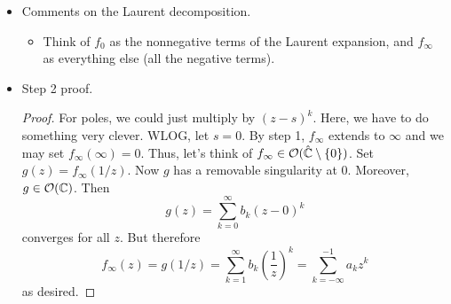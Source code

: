 \documentclass[../notes.tex]{subfiles}
\begin{document}
\begin{itemize}
\begin{proof}
\begin{figure}[H]
            \caption{Laurent decomposition theorem.}
            \label{fig:laurentDecomp}
        \end{figure}
        Additionally, $\partial D_2-\partial D_1$ is nulhomologous in $U\setminus 0$. Thus, by the general CIF,
        \begin{equation*}
            f(z) = \frac{1}{2\pi i}\int_{\partial D_2-\partial D_1}\frac{f(\zeta)}{\zeta-z}\dd\zeta
            = \underbrace{\frac{1}{2\pi i}\int_{\partial D_2}\frac{f(\zeta)}{\zeta-z}\dd\zeta}_{f_0}-\underbrace{\frac{1}{2\pi i}\int_{\partial D_1}\frac{f(\zeta)}{\zeta-z}\dd\zeta}_{-f_\infty}
        \end{equation*}
        Finally, $-f_\infty$ --- as defined above --- has an extension from $U$ to all of $\C\setminus\{0\}$ just like in the proof of the general CIF from the 4/30 lecture.
    \end{proof}
    \item Comments on the Laurent decomposition.
    \begin{itemize}
        \item Think of $f_0$ as the nonnegative terms of the Laurent expansion, and $f_\infty$ as everything else (all the negative terms).
    \end{itemize}
    \item Step 2 proof.
    \begin{proof}
        For poles, we could just multiply by $(z-s)^k$. Here, we have to do something very clever. WLOG, let $s=0$. By step 1, $f_\infty$ extends to $\infty$ and we may set $f_\infty(\infty)=0$. Thus, let's think of $f_\infty\in\mathcal{O}(\hat{\mathbb{C}}\setminus\{0\})$. Set $g(z)=f_\infty(1/z)$. Now $g$ has a removable singularity at 0. Moreover, $g\in\mathcal{O}(\mathbb{C})$. Then
        \begin{equation*}
            g(z) = \sum_{k=0}^\infty b_k(z-0)^k
        \end{equation*}
        converges for all $z$. But therefore
        \begin{equation*}
            f_\infty(z) = g(1/z)
            = \sum_{k=1}^\infty b_k\left( \frac{1}{z} \right)^k
            = \sum_{k=-\infty}^{-1}a_kz^k
        \end{equation*}
        as desired.
    \end{proof}
\end{itemize}
\end{document}
